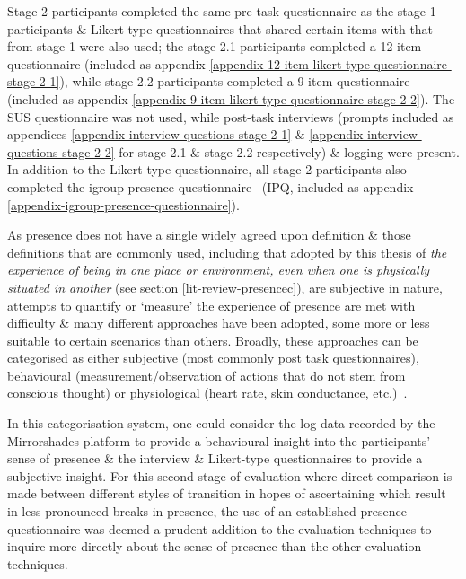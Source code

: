 Stage 2 participants completed the same pre-task questionnaire as the stage 1 participants \& Likert-type questionnaires that shared certain items with that from stage 1 were also used; the stage 2.1 participants completed a 12-item questionnaire (included as appendix \ref{appendix-12-item-likert-type-questionnaire-stage-2-1}), while stage 2.2 participants completed a 9-item questionnaire (included as appendix \ref{appendix-9-item-likert-type-questionnaire-stage-2-2}). The SUS questionnaire was not used, while post-task interviews (prompts included as appendices \ref{appendix-interview-questions-stage-2-1} \& \ref{appendix-interview-questions-stage-2-2} for stage 2.1 \& stage 2.2 respectively) \& logging were present. In addition to the Likert-type questionnaire, all stage 2 participants also completed the igroup presence questionnaire~\cite{Schubert2001} (IPQ, included as appendix \ref{appendix-igroup-presence-questionnaire}).

As presence does not have a single widely agreed upon definition \& those definitions that are commonly used, including that adopted by this thesis of \textit{the experience of being in one place or environment, even when one is physically situated in another} (see section \ref{lit-review-presencec}), are subjective in nature, attempts to quantify or `measure' the experience of presence are met with difficulty \& many different approaches have been adopted, some more or less suitable to certain scenarios than others. Broadly, these approaches can be categorised as either subjective (most commonly post task questionnaires), behavioural (measurement/observation of actions that do not stem from conscious thought) or physiological (heart rate, skin conductance, etc.)~\cite{Insko2003}.

In this categorisation system, one could consider the log data recorded by the Mirrorshades platform to provide a behavioural insight into the participants' sense of presence \& the interview \& Likert-type questionnaires to provide a subjective insight. For this second stage of evaluation where direct comparison is made between different styles of transition in hopes of ascertaining which result in less pronounced breaks in presence, the use of an established presence questionnaire was deemed a prudent addition to the evaluation techniques to inquire more directly about the sense of presence than the other evaluation techniques.


